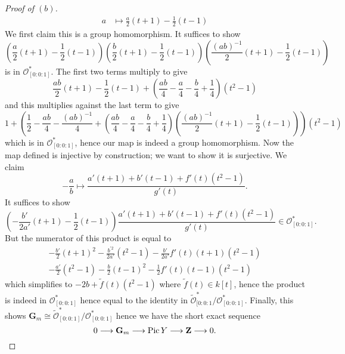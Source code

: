 \documentclass[10pt]{article}
\theoremstyle{definition}
\theoremstyle{remark}
\numberwithin{equation}{section}
\numberwithin{figure}{subsubsection}
\DeclareMathOperator{\Pic}{Pic}
\newcommand{\OO}{\mathcal{O}}
\begin{document}
\begin{proof}[Proof of $(b)$]
\begin{align*}
    a &\longmapsto \frac{a}{2} (t+1) - \frac{1}{2}(t-1)
  \end{align*}
  We first claim this is a group homomorphism. It suffices to show
  \begin{equation*}
    \left( \frac{a}{2} (t+1) - \frac{1}{2}(t-1) \right)
    \left( \frac{b}{2} (t+1) - \frac{1}{2}(t-1) \right)
    \left( \frac{(ab)^{-1}}{2} (t+1) - \frac{1}{2}(t-1) \right)
  \end{equation*}
  is in $\OO^*_{[0:0:1]}$. The first two terms multiply to give
  \begin{equation*}
    \frac{ab}{2}(t+1) - \frac{1}{2}(t-1) + \left( \frac{ab}{4} - \frac{a}{4} -
    \frac{b}{4} + \frac{1}{4} \right)(t^2-1)
  \end{equation*}
  and this multiplies against the last term to give
  \begin{equation*}
    1 + \left( \frac{1}{2} - \frac{ab}{4} - \frac{(ab)^{-1}}{4}
    + \left( \frac{ab}{4} - \frac{a}{4} -
    \frac{b}{4} + \frac{1}{4} \right)
    \left( \frac{(ab)^{-1}}{2} (t+1) - \frac{1}{2}(t-1) \right) \right)(t^2-1)
  \end{equation*}
  which is in $\OO_{[0:0:1]}^*$, hence our map is indeed a group homomorphism.
  Now the map defined is injective by construction; we want to show it is
  surjective. We claim
  \begin{equation*}
    -\frac{a}{b} \mapsto \frac{a'(t+1) + b'(t-1) + f'(t)(t^2-1)}{g'(t)}.
  \end{equation*}
  It suffices to show
  \begin{equation*}
    \left( -\frac{b'}{2a'}(t+1) - \frac{1}{2}(t-1) \right)
    \frac{a'(t+1) + b'(t-1) + f'(t)(t^2-1)}{g'(t)} \in \OO^*_{[0:0:1]}.
  \end{equation*}
  But the numerator of this product is equal to
  \begin{gather*}
    -\frac{b'}{2}(t+1)^2 - \frac{b^{\prime2}}{2a'}(t^2-1) -
    \frac{b'}{2a'}f'(t)(t+1)(t^2-1)\\
    - \frac{a'}{2}(t^2-1) - \frac{b}{2}(t-1)^2 -
    \frac{1}{2}f'(t)(t-1)(t^2-1)
  \end{gather*}
  which simplifies to $- 2b + \tilde{f}(t)(t^2-1)$ where $\tilde{f}(t) \in
  k[t]$, hence the product is indeed in $\OO^*_{[0:0:1]}$ hence equal to the
  identity in $\tilde{\OO}_{[0:0:1}^*/\OO_{[0:0:1]}^*$. Finally, this shows
  $\mathbf{G}_m \cong \tilde{\OO}_{[0:0:1]}^*/\OO_{[0:0:1]}^*$ hence we have the
  short exact sequence
  \begin{equation*}
    0 \longrightarrow \mathbf{G}_m \longrightarrow \Pic Y \longrightarrow
    \mathbf{Z} \longrightarrow 0.\qedhere
  \end{equation*}
\end{proof}
\end{document}
